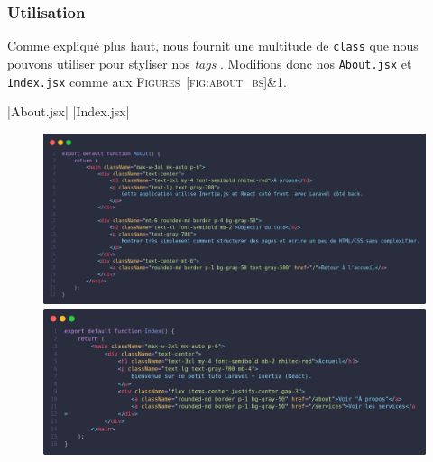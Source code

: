 \subsubsection[Utilisation]{Utilisation}

Comme expliqué plus haut, \tailwind{} nous fournit une multitude de \verb|class| que nous pouvons utiliser pour styliser nos \textit{tags} \html{}. Modifions donc nos \views{} \verb|About.jsx| et \verb|Index.jsx| comme aux \textsc{Figures~\ref{fig:about_bs}\&\ref{fig:index_bs}}.

|About.jsx|
|Index.jsx|
\begin{figure}[!ht]
    \centering
    \begin{minipage}{0.45\textwidth}
         \centering
         \includegraphics[width=\textwidth]{figures-C1/about.jsx.png}
         \caption{\protect{}\label{fig:about_bs}}
    \end{minipage}
    \begin{minipage}{0.53\textwidth}
         \centering
         \includegraphics[width=\textwidth]{figures-C1/index.jsx.png}
         \caption{\protect{}\label{fig:index_bs}}
    \end{minipage}
\end{figure}

